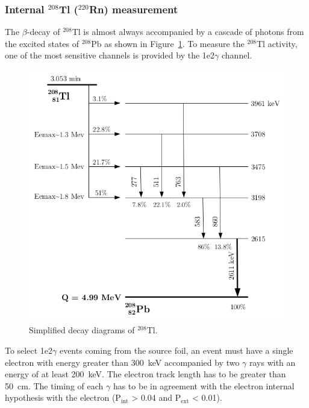 \documentclass[main.tex]{subfiles}
\begin{document}
\FloatBarrier


\subsubsection{Internal $^{\text{208}}$Tl ($^{\text{220}}$Rn) measurement}


\NI The $\beta$-decay of $^{\text{208}}$Tl is almost always accompanied by a cascade of photons from the excited states of $^{\text{208}}$Pb as shown in Figure~\ref{Tl208-decay-schema}. To measure the $^{\text{208}}$Tl activity, one of the most sensitive channels is provided by the 1e2$\gamma$ channel.


\begin{figure}[h!]
\centering
\includegraphics[scale=0.40]{pictures/Chap6/decay-tl208.png}
\caption{Simplified decay diagrams of $^{\text{208}}$Tl.}
\label{Tl208-decay-schema}
\end{figure}


\NI To select 1e2$\gamma$ events coming from the source foil, an event must have a single electron with energy greater than 300~keV accompanied by two $\gamma$ rays with an energy of at least 200~keV. The electron track length has to be greater than 50~cm. The timing of each $\gamma$ has to be in agreement with the electron internal hypothesis with the electron (P$_{\text{int}}$ > 0.04 and P$_{\text{ext}}$ < 0.01). 
\end{document}
